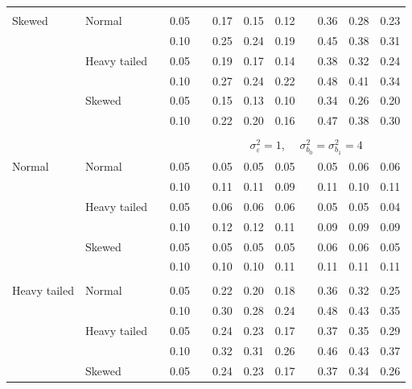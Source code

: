 \documentclass[12pt]{article} %
\begin{document}
\begin{table}[ht]
\begin{scriptsize}
\begin{center}
\begin{tabular}{ll p{.1cm} c p{.1cm} rrr p{.1cm} rrr}
             &&&&&&&&&&&\\
Skewed       & Normal       && 0.05 &&   0.17 & 0.15 & 0.12 && 0.36 & 0.28 & 0.23 \\ 
             &              && 0.10 &&   0.25 & 0.24 & 0.19 && 0.45 & 0.38 & 0.31 \\ 
             & Heavy tailed && 0.05 &&   0.19 & 0.17 & 0.14 && 0.38 & 0.32 & 0.24 \\ 
             &              && 0.10 &&   0.27 & 0.24 & 0.22 && 0.48 & 0.41 & 0.34 \\ 
             & Skewed       && 0.05 &&   0.15 & 0.13 & 0.10 && 0.34 & 0.26 & 0.20 \\ 
             &              && 0.10 &&   0.22 & 0.20 & 0.16 && 0.47 & 0.38 & 0.30 \\ 


&&&&&&&&&&&\\
& && && \multicolumn{7}{c}{$\sigma_{\varepsilon}^2 = 1$, \ \ $\sigma_{b_0}^2 = \sigma_{b_1}^2 = 4$} \\ \cline{6-12}
\rowcolor{gray!20}Normal       & Normal       && 0.05 &&   0.05 & 0.05 & 0.05 && 0.05 & 0.06 & 0.06 \\ 
\rowcolor{gray!20}             &              && 0.10 &&   0.11 & 0.11 & 0.09 && 0.11 & 0.10 & 0.11 \\ 
\rowcolor{gray!20}             & Heavy tailed && 0.05 &&   0.06 & 0.06 & 0.06 && 0.05 & 0.05 & 0.04 \\ 
\rowcolor{gray!20}             &              && 0.10 &&   0.12 & 0.12 & 0.11 && 0.09 & 0.09 & 0.09 \\ 
\rowcolor{gray!20}             & Skewed       && 0.05 &&   0.05 & 0.05 & 0.05 && 0.06 & 0.06 & 0.05 \\ 
\rowcolor{gray!20}             &              && 0.10 &&   0.10 & 0.10 & 0.11 && 0.11 & 0.11 & 0.11 \\ 
             &&&&&&&&&&&\\
Heavy tailed & Normal       && 0.05 &&   0.22 & 0.20 & 0.18 && 0.36 & 0.32 & 0.25 \\ 
             &              && 0.10 &&   0.30 & 0.28 & 0.24 && 0.48 & 0.43 & 0.35 \\ 
             & Heavy tailed && 0.05 &&   0.24 & 0.23 & 0.17 && 0.37 & 0.35 & 0.29 \\ 
             &              && 0.10 &&   0.32 & 0.31 & 0.26 && 0.46 & 0.43 & 0.37 \\ 
             & Skewed       && 0.05 &&   0.24 & 0.23 & 0.17 && 0.37 & 0.34 & 0.26 \\ 

\end{tabular}
\end{center}
\end{scriptsize}
\end{table}
\end{document}
